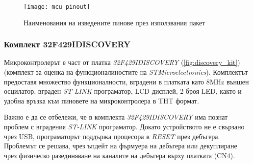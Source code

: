 \begin{figure}[htpb!]
    \centering
    \texttt{[image: mcu\_pinout]}
    \caption{Наименования на изведените пинове през използвания пакет}
    \label{fig:mcu_pinout}
\end{figure}

\subsubsection{Комплект 32F429IDISCOVERY}

Микроконтролерът е част от платка \textit{32F429IDISCOVERY} (\autoref{fig:discovery_kit})
(комплект за оценка на функционалиностите на \textit{STMicroelectronics}).
Комплектът предоставя множество функционалности, вградени в платката като
8MHz външен осцилатор, вграден \textit{ST-LINK} програматор,
LCD дисплей, 2 броя LED, както и удобна връзка към пиновете на
микроконтролера в THT формат.

Важно е да се отбележи, че в комплекта \textit{32F429IDISCOVERY}
има познат проблем с вградения \textit{ST-LINK} програматор.
Докато устройството не е свързано чрез USB, програматорът поддържа процесора в \textit{RESET}
през дебъгера.
Проблемът се решава, чрез ъпдейт на фърмуера на дебъгера 
или декуплиране чрез физическо разединяване на каналите на дебъгера върху платката (CN4). 

\FloatBarrier

